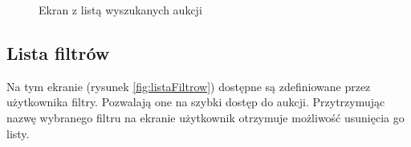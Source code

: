 \documentclass[a4paper,twoside,titlepage,openright]{book}
\begin{document}
\begin{figure}[h]
\begin{minipage}[t]{0.3\textwidth}
		\caption{Ekran z listą wyszukanych aukcji}
		\label{fig:listaWyszukanych}
	\end{minipage}
\end{figure}

\subsection{Lista filtrów}
Na tym ekranie (rysunek \ref{fig:listaFiltrow}) dostępne są zdefiniowane przez użytkownika filtry. Pozwalają one na szybki dostęp do aukcji. Przytrzymując nazwę wybranego filtru na ekranie użytkownik otrzymuje możliwość usunięcia go listy.
\end{document}
